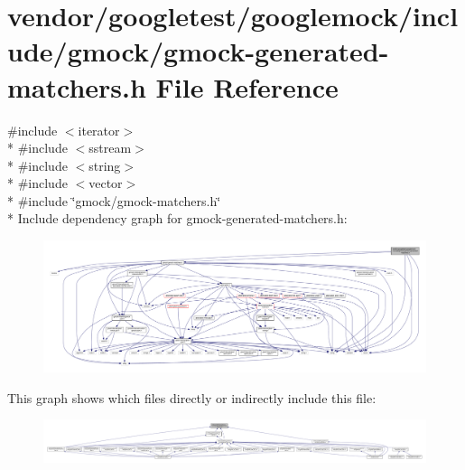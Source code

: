 \hypertarget{gmock-generated-matchers_8h}{}\section{vendor/googletest/googlemock/include/gmock/gmock-\/generated-\/matchers.h File Reference}
\label{gmock-generated-matchers_8h}
{\ttfamily \#include $<$iterator$>$}\\*
{\ttfamily \#include $<$sstream$>$}\\*
{\ttfamily \#include $<$string$>$}\\*
{\ttfamily \#include $<$vector$>$}\\*
{\ttfamily \#include \char`\"{}gmock/gmock-\/matchers.\+h\char`\"{}}\\*
Include dependency graph for gmock-\/generated-\/matchers.h\+:\nopagebreak
\begin{figure}[H]
\begin{center}
\leavevmode
\includegraphics[width=350pt]{gmock-generated-matchers_8h__incl}
\end{center}
\end{figure}
This graph shows which files directly or indirectly include this file\+:\nopagebreak
\begin{figure}[H]
\begin{center}
\leavevmode
\includegraphics[width=350pt]{gmock-generated-matchers_8h__dep__incl}
\end{center}
\end{figure}

